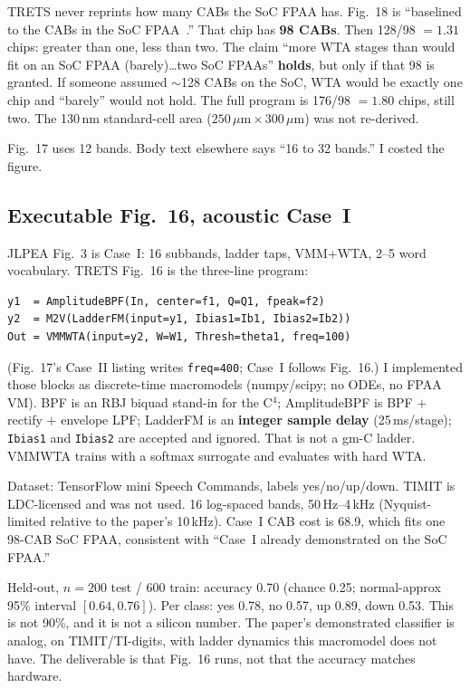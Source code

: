 \documentclass[11pt]{article}
\newcommand{\code}[1]{\texttt{#1}}
\begin{document}
TRETS never reprints how many CABs the SoC FPAA has. Fig.~18 is
``baselined to the CABs in the SoC FPAA~\cite{socfpaa}.'' That chip has
\textbf{98 CABs}. Then 128/98 $= \mathbf{1.31}$ chips: greater than
one, less than two. The claim ``more WTA stages than would fit on an
SoC FPAA (barely)\ldots two SoC FPAAs'' \textbf{holds}, but only if
that 98 is granted. If someone assumed $\sim$128 CABs on the SoC, WTA
would be exactly one chip and ``barely'' would not hold. The full
program is 176/98 $= 1.80$ chips, still two. The 130\,nm standard-cell
area ($250\,\mu\mathrm{m}\times 300\,\mu\mathrm{m}$) was not
re-derived.

Fig.~17 uses 12 bands. Body text elsewhere says ``16 to 32 bands.'' I
costed the figure.

\subsection{Executable Fig.~16, acoustic Case~I}

JLPEA Fig.~3 is Case~I: 16 subbands, ladder taps, VMM+WTA, 2--5 word
vocabulary. TRETS Fig.~16 is the three-line program:

\begin{verbatim}
y1  = AmplitudeBPF(In, center=f1, Q=Q1, fpeak=f2)
y2  = M2V(LadderFM(input=y1, Ibias1=Ib1, Ibias2=Ib2))
Out = VMMWTA(input=y2, W=W1, Thresh=theta1, freq=100)
\end{verbatim}

(Fig.~17's Case~II listing writes \code{freq=400}; Case~I follows
Fig.~16.) I implemented those blocks as discrete-time macromodels
(numpy/scipy; no ODEs, no FPAA VM). BPF is an RBJ biquad stand-in for
the C$^4$; AmplitudeBPF is BPF $+$ rectify $+$ envelope LPF; LadderFM
is an \textbf{integer sample delay} (25\,ms/stage); \code{Ibias1} and
\code{Ibias2} are accepted and ignored. That is not a gm-C ladder.
VMMWTA trains with a softmax surrogate and evaluates with hard WTA.

Dataset: TensorFlow mini Speech Commands, labels yes/no/up/down. TIMIT
is LDC-licensed and was not used. 16 log-spaced bands, 50\,Hz--4\,kHz
(Nyquist-limited relative to the paper's 10\,kHz). Case~I CAB cost is
68.9, which fits one 98-CAB SoC FPAA, consistent with ``Case~I already
demonstrated on the SoC FPAA.''

Held-out, $n=200$ test / 600 train: accuracy 0.70 (chance 0.25;
normal-approx 95\% interval $[0.64, 0.76]$). Per class: yes 0.78, no
0.57, up 0.89, down 0.53. This is not 90\%, and it is not a silicon
number. The paper's demonstrated classifier is analog, on
TIMIT/TI-digits, with ladder dynamics this macromodel does not have.
The deliverable is that Fig.~16 runs, not that the accuracy matches
hardware.
\end{document}
